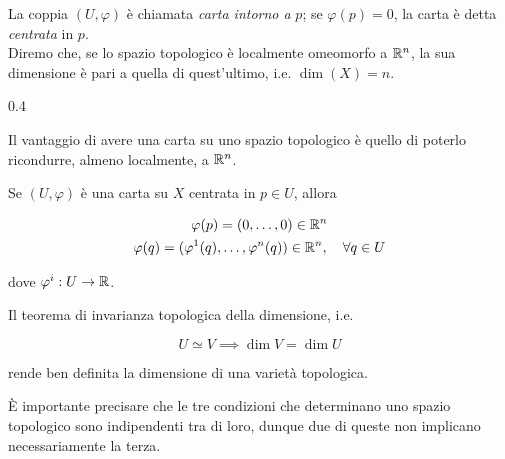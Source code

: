 La coppia $ (U,\varphi) $ è chiamata \textit{carta intorno a} $ p $; se $ \varphi(p) = 0 $, la carta è detta \textit{centrata} in $ p $. \\
Diremo che, se lo spazio topologico è localmente omeomorfo a $ \mathbb{R}^{n} $, la sua dimensione è pari a quella di quest'ultimo, i.e. $ \dim (X) = n $.

	{0.4}{%
		}

Il vantaggio di avere una carta su uno spazio topologico è quello di poterlo ricondurre, almeno localmente, a $ \mathbb{R}^{n} $.

\begin{remark}
	Se $ (U,\varphi) $ è una carta su $ X $ centrata in $ p \in U $, allora
	
	\begin{gather}
		\varphi(p) = (0, \dots, 0) \in \R^{n} \\
		\varphi(q) = (\varphi^{1}(q), \dots, \varphi^{n}(q)) \in \R^{n} \qcomma \forall q \in U
	\end{gather}

	dove $ \varphi^{i} : U \to \mathbb{R} $.
\end{remark}

\begin{remark}
	Il teorema di invarianza topologica della dimensione, i.e.
	
	\begin{equation}
		U \simeq V \implies \dim V = \dim U
	\end{equation}

	rende ben definita la dimensione di una varietà topologica.
\end{remark}

È importante precisare che le tre condizioni che determinano uno spazio topologico sono indipendenti tra di loro, dunque due di queste non implicano necessariamente la terza.

